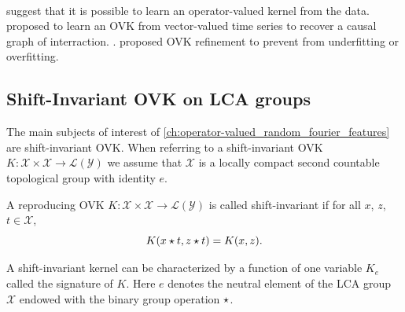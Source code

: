 \paragraph{}
\citet{Dinuzzo2011, dinuzzo2011learning} suggest that it is possible to learn
an operator-valued kernel from the data. \citet{liu2010learning, Sindhwani2013,
lim2013okvar, lim2015operator} proposed to learn an \acs{OVK} from
vector-valued time series to recover a causal graph of interraction.
\citet{audiffren2013online}. \citet{Zhang2012} proposed \acl{OVK} refinement to
prevent from underfitting or overfitting.

\subsection{Shift-Invariant \acs{OVK} on \acs{LCA}
groups}
The main subjects of interest of
\cref{ch:operator-valued_random_fourier_features} are shift-invariant
\acl{OVK}. When referring to a shift-invariant \ac{OVK}
$K:\mathcal{X}\times\mathcal{X}\to\mathcal{L}(\mathcal{Y})$ we assume that
$\mathcal{X}$ is a locally compact second countable topological group with
identity
$e$.
\begin{definition}
    A reproducing \acl{OVK}
    $K:\mathcal{X}\times\mathcal{X}\to\mathcal{L}(\mathcal{Y})$ is called
    shift-invariant if for all $x$, $z$, $t\in\mathcal{X}$,
    \begin{dmath}
        \label{eq:def_shift_inv}
        K(x\groupop t, z\groupop t) = K(x, z).
    \end{dmath}
\end{definition}
A shift-invariant kernel can be characterized by a function of one variable
$K_e$ called the signature of $K$. Here $e$ denotes the neutral element of the
\ac{LCA} group $\mathcal{X}$ endowed with the binary group operation
$\star$.
